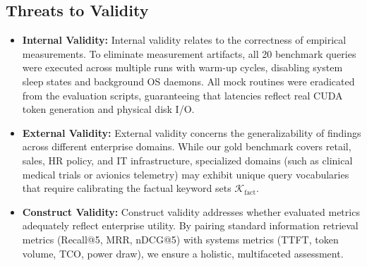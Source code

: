 \subsection{Threats to Validity}
\begin{itemize}
    \item \textbf{Internal Validity:} Internal validity relates to the correctness of empirical measurements. To eliminate measurement artifacts, all 20 benchmark queries were executed across multiple runs with warm-up cycles, disabling system sleep states and background OS daemons. All mock routines were eradicated from the evaluation scripts, guaranteeing that latencies reflect real CUDA token generation and physical disk I/O.
    \item \textbf{External Validity:} External validity concerns the generalizability of findings across different enterprise domains. While our gold benchmark covers retail, sales, HR policy, and IT infrastructure, specialized domains (such as clinical medical trials or avionics telemetry) may exhibit unique query vocabularies that require calibrating the factual keyword sets $\mathcal{K}_{\text{fact}}$.
    \item \textbf{Construct Validity:} Construct validity addresses whether evaluated metrics adequately reflect enterprise utility. By pairing standard information retrieval metrics (Recall@5, MRR, nDCG@5) with systems metrics (TTFT, token volume, TCO, power draw), we ensure a holistic, multifaceted assessment.
\end{itemize}
